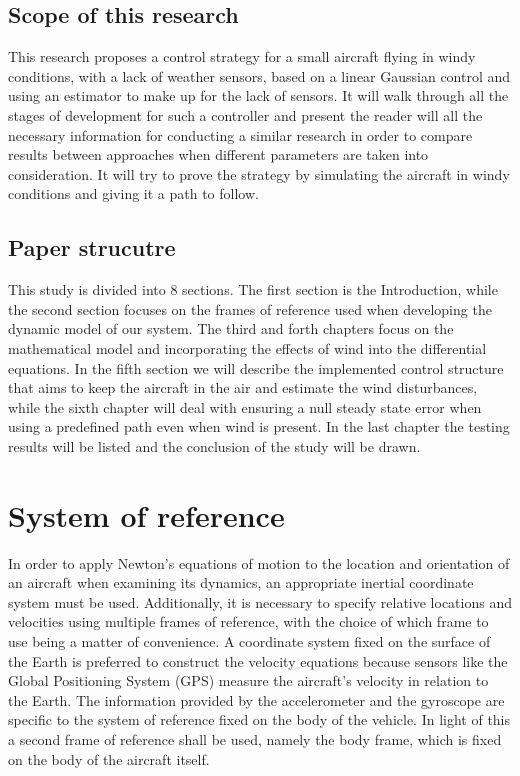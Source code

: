 \documentclass[conference]{IEEEtran}
\begin{document}
\subsection{Scope of this research}
This research proposes a control strategy for a small aircraft flying in windy
conditions, with a lack of weather sensors, based on a linear Gaussian control
and using an estimator to make up for the lack of sensors. It will walk through
all the stages of development for such a controller and present the reader will
all the necessary information for conducting a similar research in order to
compare results between approaches when different parameters are taken into
consideration. It will try to prove the strategy by simulating the aircraft in
windy conditions and giving it a path to follow.
\subsection{Paper strucutre}
This study is divided into 8 sections. The first section is the Introduction,
while the second section focuses on the frames of reference used when
developing the dynamic model of our system. The third and forth chapters focus
on the mathematical model and incorporating the effects of wind into the
differential equations. In the fifth section we will describe the implemented
control structure that aims to keep the aircraft in the air and estimate the
wind disturbances, while the sixth chapter will deal with ensuring a null
steady state error when using a predefined path even when wind is present. In
the last chapter the testing results will be listed and the conclusion of the
study will be drawn.

\section{System of reference}
In order to apply Newton's equations of motion to the location and orientation
of an aircraft when examining its dynamics, an appropriate inertial coordinate
system must be used. Additionally, it is necessary to specify relative
locations and velocities using multiple frames of reference, with the choice of
which frame to use being a matter of convenience. A coordinate system fixed on
the surface of the Earth is preferred to construct the velocity equations
because sensors like the Global Positioning System (GPS) measure the aircraft's
velocity in relation to the Earth. The information provided by the
accelerometer and the gyroscope are specific to the system of reference fixed
on the body of the vehicle. In light of this a second frame of reference shall
be used, namely the body frame, which is fixed on the body of the aircraft
itself.
\end{document}
